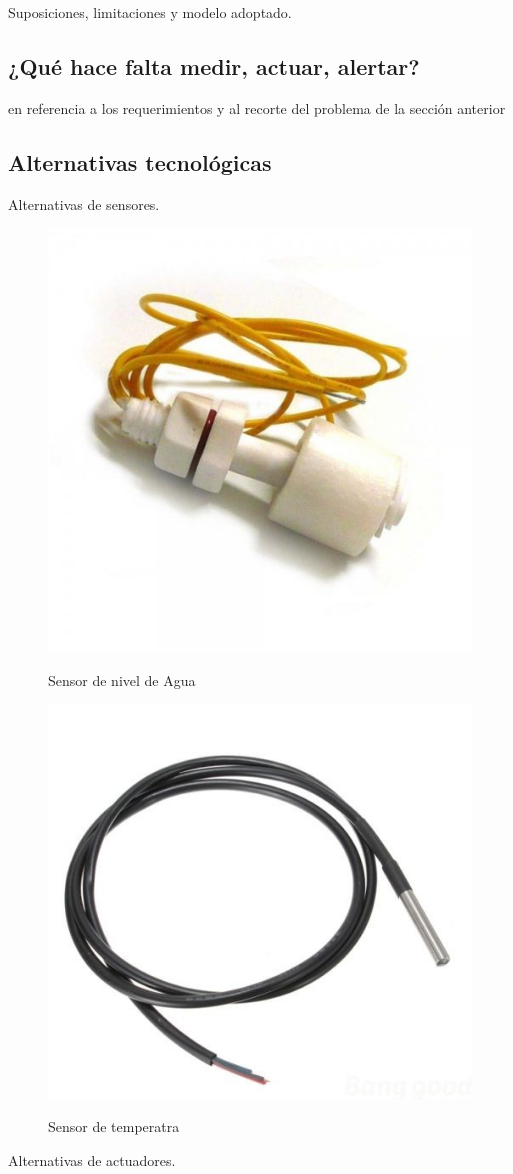 Suposiciones, limitaciones y modelo adoptado.


\subsection{¿Qué hace falta medir, actuar, alertar?}

en referencia a los requerimientos y al recorte del problema de la sección anterior


\subsection{Alternativas tecnológicas}

Alternativas de sensores.
\begin{figure}[h!]
	\centering
    \includegraphics[width=.5\textwidth]{./Figures/sensor_nivel}
	\label{fig:Sensor de nivel}
	\caption{Sensor de nivel de Agua}
\end{figure}

\begin{figure}[h!]
	\centering
    \includegraphics[width=.5\textwidth]{./Figures/sensor_temp}
	\label{fig:Sensor de temperatura}
	\caption{Sensor de temperatra}
\end{figure}
Alternativas de actuadores.

